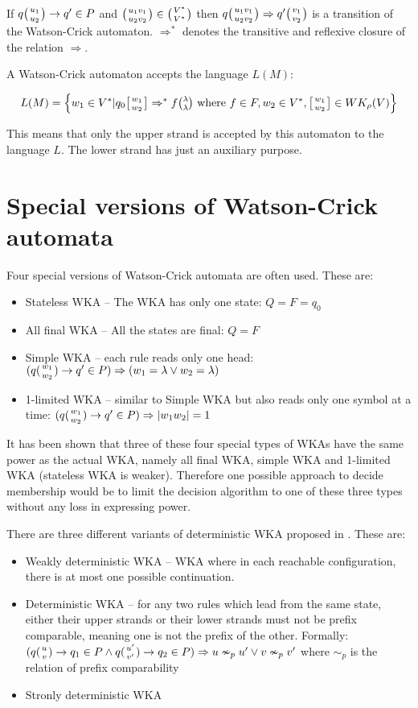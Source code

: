 If $q\big({u_1 \atop u_2}\big) \rightarrow q' \in P$ and $\big({u_1 v_1 \atop u_2 v_2}\big) \in \big({V^* \atop V^*}\big)$ then $q\big({u_1 v_1 \atop u_2 v_2}\big) \Rightarrow q'\big({v_1 \atop v_2}\big)$ is a transition of the Watson-Crick automaton. $\Rightarrow^*$ denotes the transitive and reflexive closure of the relation $\Rightarrow$.

A Watson-Crick automaton accepts the language $L(M)$:

$$L(M) = \Big\{w_1 \in V^* | q_0 \wkdomain{w_1}{w_2} \Rightarrow^* f \genfrac{(}{)}{0pt}{1}{\lambda}{\lambda} \textnormal{ where } f \in F, w_2 \in V^*, \wkdomain{w_1}{w_2} \in WK_{\rho}(V)\Big\}$$

This means that only the upper strand is accepted by this automaton to the language $L$. The lower strand has just an auxiliary purpose.

\section{Special versions of Watson-Crick automata}
Four special versions of Watson-Crick automata are often used. These are:
\begin{itemize}
  \item{Stateless WKA -- The WKA has only one state: $Q = F = {q_0}$}
  \item{All final WKA -- All the states are final: $Q = F$}
  \item{Simple WKA -- each rule reads only one head: $(q({w_1 \atop w_2}) \rightarrow q' \in P) \Rightarrow (w_1 = \lambda \vee w_2 = \lambda)$}
  \item{1-limited WKA -- similar to Simple WKA but also reads only one symbol at a time: $(q({w_1 \atop w_2}) \rightarrow q' \in P) \Rightarrow |w_1 w_2| = 1$}
\end{itemize}

It has been shown that three of these four special types of WKAs have the same power as the actual WKA, namely all final WKA, simple WKA and 1-limited WKA (stateless WKA is weaker). Therefore one possible approach to decide membership would be to limit the decision algorithm to one of these three types without any loss in expressing power.

There are three different variants of deterministic WKA proposed in \cite{DETERM_WKA}. These are:
\begin{itemize}
  \item{Weakly deterministic WKA -- WKA where in each reachable configuration, there is at most one possible continuation.}
  \item{Deterministic WKA -- for any two rules which lead from the same state, either their upper strands or their lower strands must not be prefix comparable, meaning one is not the prefix of the other. Formally: $(q({u \atop v}) \rightarrow q_1 \in P \wedge q({u' \atop v'}) \rightarrow q_2 \in P) \Rightarrow u \nsim_p u' \vee v \nsim_p v'$ where $\sim_p$ is the relation of prefix comparability}
  \item{Stronly deterministic WKA}
\end{itemize}

